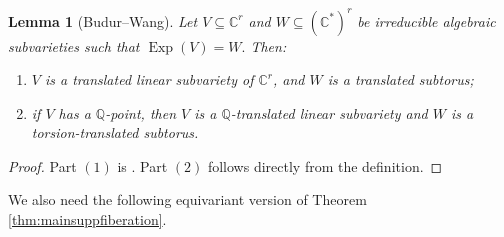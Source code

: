 \documentclass{amsart}
\theoremstyle{plain}
\numberwithin{theorem}{section}
\newtheorem{lemma}[theorem]{Lemma}
\theoremstyle{definition}
\theoremstyle{remark}
\theoremstyle{definition}
\newcommand{\C}{\mathbb{C}} %
\newcommand{\Q}{\mathbb{Q}}
\begin{document}
\begin{lemma}[Budur--Wang]\label{lm:BudurWang}
Let $V\subseteq \C^r$ and $W\subseteq(\C^*)^r$ be irreducible algebraic
subvarieties such that
$\operatorname{Exp}(V)=W.$
Then:
\begin{enumerate}[label=$(\arabic*)$]
    \item $V$ is a translated linear subvariety of $\C^r$, and $W$ is a
    translated subtorus;
    \item if $V$ has a $\Q$-point, then $V$ is a $\Q$-translated linear
    subvariety and $W$ is a torsion-translated subtorus.
\end{enumerate}
\end{lemma}

\begin{proof}
Part $(1)$ is \cite[Prop.1.4 and Lem.2.1]{BWjlk}. Part $(2)$ follows
directly from the definition.
\end{proof}

We also need the following equivariant version of
Theorem \ref{thm:mainsuppfiberation}.
\end{document}
